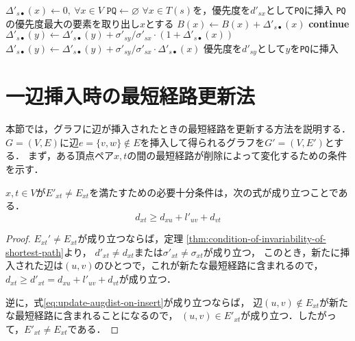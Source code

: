\begin{algorithm}[tbp]
\begin{multicols}{2}
\begin{algorithmic}[1]
      \EndFor
      \EndProcedure
      \vfill\null
      \columnbreak
      \State $\Delta'_{s\bullet}(x)\gets0,\:\forall x\in V$
      \State $\texttt{PQ}\gets\varnothing$
      \State $\forall x\in T(s)$を，優先度を$d'_{sx}$として\texttt{PQ}に挿入
      \State \texttt{PQ}の優先度最大の要素を取り出し$x$とする
      \State $B(x)\gets B(x)+\Delta'_{s\bullet}(x)$
      \State \textbf{continue}
      \EndIf
      \State $\Delta'_{s\bullet}(y)\gets\Delta'_{s\bullet}(y)+\sigma'_{sy}/\sigma'_{sx}\cdot(1+\Delta'_{s\bullet}(x))$
      \Else
      \State $\Delta'_{s\bullet}(y)\gets\Delta'_{s\bullet}(y)+\sigma'_{sy}/\sigma'_{sx}\cdot\Delta'_{s\bullet}(x)$
      \EndIf
      \State 優先度を$d'_{sy}$として$y$を\texttt{PQ}に挿入
      \EndIf
      \EndFor
      \EndWhile
      \EndFor
      \EndProcedure
    \end{algorithmic}
  \end{multicols}
\end{algorithm}

\section{一辺挿入時の最短経路更新法}
\label{sect:update-apsp-on-insert}
本節では，グラフに辺が挿入されたときの最短経路を更新する方法を説明する．
$G=(V,E)$に辺$e=\{v,w\} \not\in E$を挿入して得られるグラフを$G'=(V,E')$とする．
まず，ある頂点ペア$x,t$の間の最短経路が削除によって変化するための条件を示す．

\begin{lemma}
  \label{lmm:update-augdist-on-insert}
  $x,t\in V$が$E'_{xt}\neq E_{xt}$を満たすための必要十分条件は，次の式が成り立つことである．
  \begin{equation}
    d_{xt}\geq d_{xu}+l'_{uv}+d_{vt}
    \label{eq:update-augdist-on-insert}
  \end{equation}
\end{lemma}
\begin{proof}
  $E_{xt}'\neq E_{xt}$が成り立つならば，定理
  \ref{thm:condition-of-invariability-of-shortest-path}より，
  $d'_{xt}\neq d_{xt}$または$\sigma'_{xt}\neq\sigma_{xt}$が成り立つ，
  このとき，新たに挿入された辺は$(u,v)$のひとつで，これが新たな最短経路に含まれるので，
  $d_{xt}\geq d'_{xt}=d_{xu}+l'_{uv}+d_{vt}$が成り立つ．

  逆に，式\eqref{eq:update-augdist-on-insert}が成り立つならば，
  辺$(u,v)\notin E_{xt}$が新たな最短経路に含まれることになるので，
  $(u,v)\in E'_{xt}$が成り立つ．したがって，$E'_{xt}\neq E_{xt}$である．
\end{proof}

